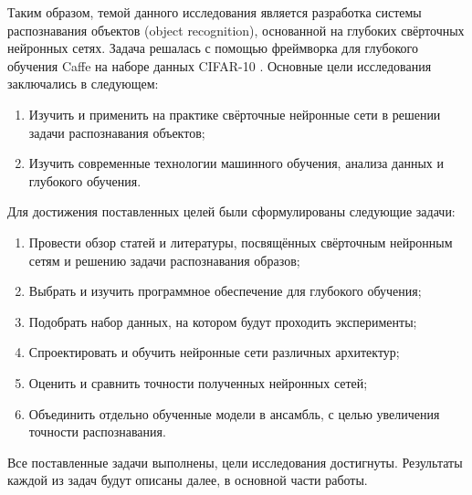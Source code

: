 Таким образом, темой данного исследования является разработка системы распознавания объектов 
(object recognition), основанной на глубоких свёрточных нейронных сетях. Задача решалась с помощью  
фреймворка для глубокого обучения Caffe \cite{jia2014caffe} на наборе данных CIFAR-10 
\cite{learningmultiple}. Основные цели исследования заключались в следующем:
\begin{enumerate}
    \item Изучить и применить на практике свёрточные нейронные сети в решении задачи распознавания 
    объектов;
    \item Изучить современные технологии машинного обучения, анализа данных и глубокого  
    обучения.
\end{enumerate}
Для достижения поставленных целей были сформулированы следующие задачи:
\begin{enumerate}
    \item Провести обзор статей и литературы, посвящённых свёрточным нейронным сетям и решению 
    задачи распознавания образов;
    \item Выбрать и изучить программное обеспечение для глубокого обучения;
    \item Подобрать набор данных, на котором будут проходить эксперименты;
    \item Спроектировать и обучить нейронные сети различных архитектур;
    \item Оценить и сравнить точности полученных нейронных сетей;
    \item Объединить отдельно обученные модели в ансамбль, с целью увеличения точности 
    распознавания.
\end{enumerate}
Все поставленные задачи выполнены, цели исследования достигнуты. Результаты каждой из задач будут 
описаны далее, в основной части работы.



